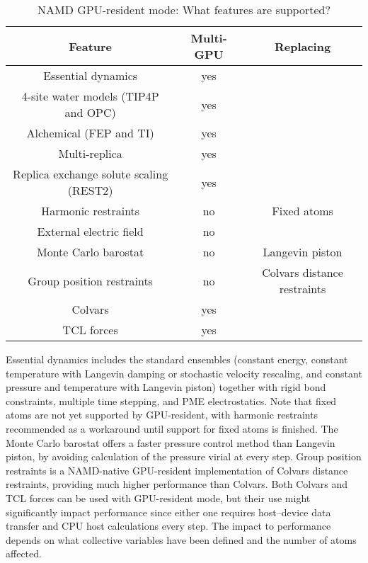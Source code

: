 \begin{table}[htb]
\caption{NAMD GPU-resident mode: What features are supported?}
\begin{center}
\begin{tabular}{c|c|c}
\textbf{Feature} & \textbf{Multi-GPU} & \textbf{Replacing} \\ \hline
Essential dynamics                      & yes & \\
4-site water models (TIP4P and OPC)     & yes & \\
Alchemical (FEP and TI)                 & yes & \\
Multi-replica                           & yes & \\
Replica exchange solute scaling (REST2) & yes & \\
Harmonic restraints                     & no  & Fixed atoms \\
External electric field                 & no  & \\
Monte Carlo barostat                    & no  & Langevin piston \\
Group position restraints               & no  & Colvars distance restraints \\
Colvars                                 & yes & \\
TCL forces                              & yes &
\end{tabular}
\end{center}
\label{table:gpures-features}
\end{table}

Essential dynamics includes the standard ensembles (constant energy,
constant temperature with Langevin damping or stochastic velocity rescaling,
and constant pressure and temperature with Langevin piston)
together with rigid bond constraints, multiple time stepping,
and PME electrostatics.
Note that fixed atoms are not yet supported by GPU-resident,
with harmonic restraints recommended as a workaround until
support for fixed atoms is finished.
The Monte Carlo barostat offers a faster pressure control method
than Langevin piston, by avoiding calculation of the pressure virial
at every step.
Group position restraints is a NAMD-native GPU-resident implementation of
Colvars distance restraints, providing much higher performance than Colvars.
Both Colvars and TCL forces can be used with GPU-resident mode,
but their use might significantly impact performance since either one
requires host--device data transfer and CPU host calculations every step.
The impact to performance depends on what collective variables have
been defined and the number of atoms affected.

